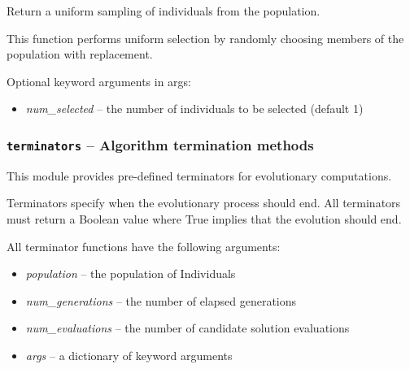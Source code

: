 \documentclass[letterpaper,10pt,english]{sphinxmanual}
\begin{document}

\begin{fulllineitems}
\label{reference:inspyred.ec.selectors.uniform_selection}
Return a uniform sampling of individuals from the population.

This function performs uniform selection by randomly choosing
members of the population with replacement.

Optional keyword arguments in args:
\begin{itemize}
\item {} 
\emph{num\_selected} -- the number of individuals to be selected 
(default 1)

\end{itemize}

\end{fulllineitems}

\label{reference:module-inspyred.ec.terminators}

\subsubsection{\texttt{terminators} -- Algorithm termination methods}
\label{reference:terminators-algorithm-termination-methods}
This module provides pre-defined terminators for evolutionary computations.

Terminators specify when the evolutionary process should end. All 
terminators must return a Boolean value where True implies that 
the evolution should end.

All terminator functions have the following arguments:
\begin{itemize}
\item {} 
\emph{population} -- the population of Individuals

\item {} 
\emph{num\_generations} -- the number of elapsed generations

\item {} 
\emph{num\_evaluations} -- the number of candidate solution evaluations

\item {} 
\emph{args} -- a dictionary of keyword arguments

\end{itemize}
\end{document}
